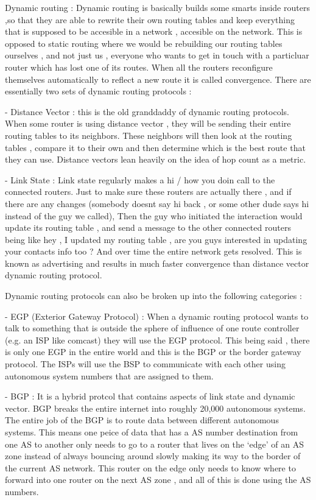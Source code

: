Dynamic routing : Dynamic routing is basically builds some smarts inside routers
,so that they are able to rewrite their own routing tables and keep everything
that is supposed to be accesible in a network , accesible on the network. This
is opposed to static routing where we would be rebuilding our routing tables
ourselves , and not just us , everyone who wants to get in touch with a
particluar router which has lost one of its routes. When all the routers
reconfigure themselves automatically to reflect a new route it is called
convergence. There are essentially two sets of dynamic routing protocols :

 - Distance Vector : this is the old granddaddy of dynamic routing protocols.
 When some router is using distance vector , they will be sending their entire
 routing tables to its neighbors. These neighbors will then look at the routing
 tables , compare it to their own and then determine which is the best route
 that they can use. Distance vectors lean heavily on the idea of hop count as a
 metric.

 - Link State : Link state regularly makes a hi / how you doin call to the
 connected routers. Just to make sure these routers are actually there , and if
 there are any changes (somebody doesnt say hi back , or some other dude says hi
 instead of the guy we called), Then the guy who initiated the interaction would
 update its routing table , and send a message to the other connected routers
 being like hey , I updated my routing table , are you guys interested in
 updating your contacts info too ? And over time the entire network gets
 resolved. This is known as advertising and results in much faster convergence
 than distance vector dynamic routing protocol.

Dynamic routing protocols can also be broken up into the following categories :

 - EGP (Exterior Gateway Protocol) : When a dynamic routing protocol wants to
 talk to something that is outside the sphere of influence of one route
 controller (e.g. an ISP like comcast) they will use the EGP protocol. This
 being said , there is only one EGP in the entire world and this is the BGP or
 the border gateway protocol. The ISPs will use the BSP to communicate with each
 other using autonomous system numbers that are assigned to them.

 - BGP : It is a hybrid protcol that contains aspects of link state and dynamic
 vector. BGP breaks the entire internet into roughly 20,000 autonomous systems.
 The entire job of the BGP is to route data between different autonomous
 systems. This means one peice of data that has a AS number destination from one
 AS to another only needs to go to a router that lives on the `edge' of an AS
 zone instead of always bouncing around slowly making its way to the border of
 the current AS network. This router on the edge only needs to know where to
 forward into one router on the next AS zone , and all of this is done using the
 AS numbers.

